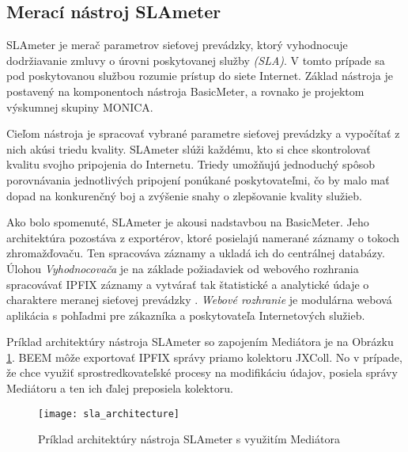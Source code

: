 \subsection{Merací nástroj SLAmeter}

SLAmeter je merač parametrov sieťovej prevádzky, ktorý vyhodnocuje dodržiavanie zmluvy o úrovni poskytovanej 
služby \emph{(SLA)}. V tomto prípade sa pod poskytovanou službou rozumie prístup do siete 
Internet. Základ nástroja je postavený na komponentoch nástroja BasicMeter, a rovnako je projektom 
výskumnej skupiny MONICA. 

Cieľom nástroja je spracovať vybrané parametre sieťovej prevádzky a vypočítať z nich akúsi triedu 
kvality. SLAmeter slúži každému, kto si chce skontrolovať kvalitu svojho pripojenia do Internetu. 
Triedy umožňujú jednoduchý spôsob porovnávania jednotlivých pripojení ponúkané poskytovateľmi, 
čo by malo mať dopad na konkurenčný boj a zvýšenie snahy o zlepšovanie kvality služieb. \citep{slameter}

Ako bolo spomenuté, SLAmeter je akousi nadstavbou na BasicMeter. Jeho architektúra pozostáva z exportérov,
ktoré posielajú namerané záznamy o tokoch zhromažďovaču. Ten spracováva záznamy a ukladá ich do 
centrálnej databázy. Úlohou \emph{Vyhodnocovača} je na základe požiadaviek od webového rozhrania 
spracovávať IPFIX záznamy a vytvárať tak štatistické a analytické údaje o charaktere 
meranej sieťovej prevádzky \citep{evaluator}. \emph{Webové rozhranie} je modulárna webová aplikácia 
s pohľadmi pre zákazníka a poskytovateľa Internetových služieb.

Príklad architektúry nástroja SLAmeter so zapojením Mediátora je na Obrázku \ref{o:sla_architecture}.
BEEM môže exportovať IPFIX správy priamo kolektoru JXColl. No v prípade, že chce využiť sprostredkovateľské 
procesy na modifikáciu údajov, posiela správy Mediátoru a ten ich ďalej preposiela kolektoru.

\begin{figure}[ht!]
\centering
\texttt{[image: sla\_architecture]}
\caption{Príklad architektúry nástroja SLAmeter s využitím Mediátora}\label{o:sla_architecture}
\end{figure}